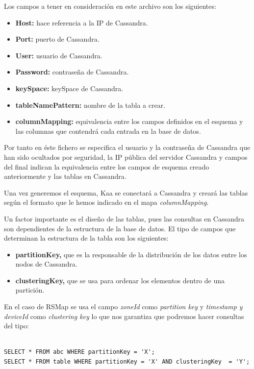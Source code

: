 Los campos a tener en consideración en este archivo son los siguientes:

\begin{itemize}
	\item \textbf{Host:} hace referencia a la IP de Cassandra.
	\item \textbf{Port:} puerto de Cassandra.
	\item \textbf{User:} usuario de Cassandra.
	\item \textbf{Password:} contraseña de Cassandra.
	\item \textbf{keySpace:} keySpace de Cassandra.
	\item \textbf{tableNamePattern:} nombre de la tabla a crear.
	\item \textbf{columnMapping:} equivalencia entre los campos definidos en el esquema y las columnas que contendrá cada entrada en la base de datos.
\end{itemize}


Por tanto en éste fichero se especifica el usuario y la contraseña de Cassandra que han sido ocultados por seguridad, la IP pública del servidor Cassandra y campos del final indican la equivalencia entre los campos de esquema creado anteriormente y las tablas en Cassandra.

Una vez generemos el esquema, Kaa se conectará a Cassandra y creará las tablas según el formato que le hemos indicado en el mapa \textit{columnMapping}.

\bigskip

Un factor importante es el diseño de las tablas, pues las consultas en Cassandra son dependientes de la estructura de la base de datos. El tipo de campos que determinan la estructura de la tabla son los siguientes:

\begin{itemize}
\item \textbf{partitionKey, } que es la responsable de la distribución de los datos entre los nodos de Cassandra.
\item \textbf{clusteringKey, } que se usa para ordenar los elementos dentro de una partición.
\end{itemize}

En el caso de RSMap se usa el campo \textit{zoneId} como \textit{partition key} y \textit{timestamp y deviceId} como \textit{clustering key} lo que nos garantiza que podremos hacer consultas del tipo:


\begin{lstlisting}[language=cql,caption={Mécanica de consultas en CQL según la estructura de tablas},label={lst:json_personal}]

SELECT * FROM abc WHERE partitionKey = 'X';
SELECT * FROM table WHERE partitionKey = 'X' AND clusteringKey  = 'Y';

\end{lstlisting}

